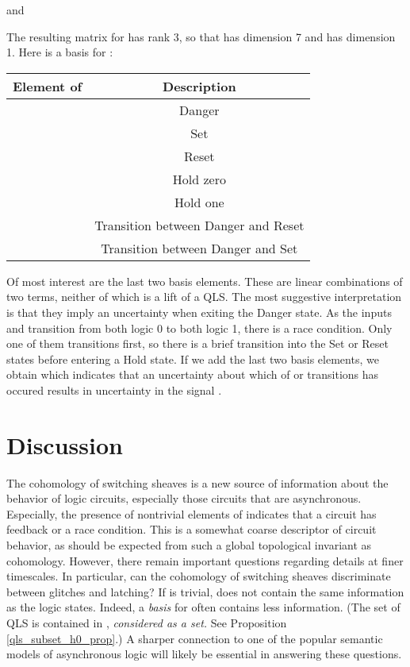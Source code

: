 \documentclass{amsart}
\theoremstyle{plain}
\theoremstyle{definition}
\begin{document}
and
  
The resulting matrix for  has rank 3, so that  has dimension 7 and  has dimension 1.  Here is a basis for :
\begin{center}
\begin{tabular}{c|c}
Element of &Description\\
\hline
&Danger\\
&Set\\
&Reset\\
&Hold zero\\
&Hold one\\
&Transition between Danger and Reset\\
&Transition between Danger and Set\\
\end{tabular}
\end{center}
Of most interest are the last two basis elements.  These are linear
combinations of two terms, neither of which is a lift of a QLS.  The
most suggestive interpretation is that they imply an uncertainty when
exiting the Danger state.  As the inputs  and  transition from
both logic 0 to both logic 1, there is a race condition.  Only one of
them transitions first, so there is a brief transition into
the Set or Reset states before entering a Hold state.  If we add the
last two basis elements, we obtain  which indicates that an
uncertainty about which of  or  transitions has occured results
in uncertainty in the signal .

\section{Discussion}
\label{discussion_sec}

The cohomology of switching sheaves is a new source of information
about the behavior of logic circuits, especially those circuits that
are asynchronous.  Especially, the presence of nontrivial elements of
 indicates that a circuit has feedback or a race condition.  This
is a somewhat coarse descriptor of circuit behavior, as should be
expected from such a global topological invariant as cohomology.
However, there remain important questions regarding details at finer
timescales.  In particular, can the cohomology of switching sheaves
discriminate between glitches and latching?  If  is trivial,
 does not contain the same information as the logic states.
Indeed, a {\it basis} for  often contains less information.  (The
set of QLS is contained in , {\it considered as a set.}  See
Proposition \ref{qls_subset_h0_prop}.)  A sharper
connection to one of the popular semantic models of asynchronous logic
will likely be essential in answering these questions.



\end{document}
